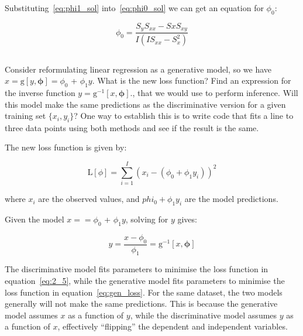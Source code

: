 \documentclass[12pt]{report}
\begin{document}
Substituting~\eqref{eq:phi1_sol} into~\eqref{eq:phi0_sol} we can get an equation for $\phi_{0}$:

\begin{equation}
    \phi_{0} = \frac{S_{y}S_{xx}-S{x}S_{xy}}{I(IS_{xx}-S_{x}^{2})}
    \label{eq:phi0_sol_final}
\end{equation}



\subsection{}
\begin{mdframed}
    Consider reformulating linear regression as a generative model, so we have $x = \text{g}[y, \boldsymbol{\phi}] = \phi_{0}$ + $\phi_{1}y$. What is the new loss function? Find an expression for the inverse function $y = \text{g}^{-1}[x, \boldsymbol{\phi}]$., that we would use to perform inference. Will this model make the same predictions as the discriminative version for a given training set $\{x_{i}, y_{i}\}$? One way to establish this is to write code that fits a line to three data points using both methods and see if the result is the same.
\end{mdframed}

The new loss function is given by:

\begin{equation}
    \text{L}[\phi] = \sum_{i=1}^{I}(x_{i} - (\phi_{0} + \phi_{1}y_{i}))^{2}
    \label{eq:gen_loss}
\end{equation}

where $x_{i}$ are the observed values, and $phi_{0} + \phi_{1}y_{i}$ are the model predictions.

Given the model $x = = \phi_{0}$ + $\phi_{1}y$, solving for $y$ gives:

\begin{equation}
    y = \frac{x - \phi_{0}}{\phi_{1}} = \text{g}^{-1}[x, \boldsymbol{\phi}]
\end{equation}

The discriminative model fits parameters to minimise the loss function in equation~\eqref{eq:2_5}, while the generative model fits parameters to minimise the loss function in equation~\eqref{eq:gen_loss}. For the same dataset, the two models generally will not make the same predictions. This is because the generative model assumes $x$ as a function of $y$, while the discriminative model assumes $y$ as a function of $x$, effectively ``flipping'' the dependent and independent variables.
\end{document}
